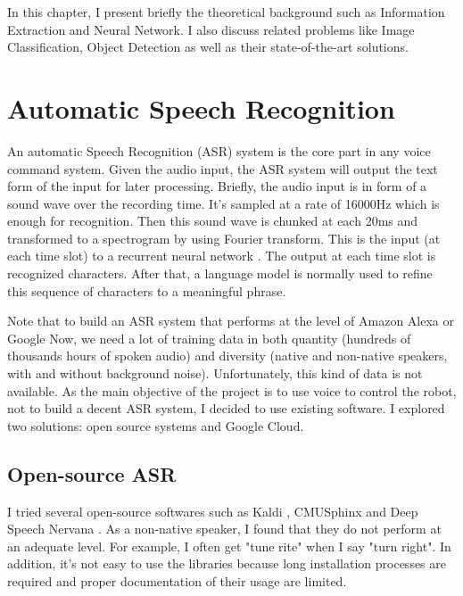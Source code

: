 In this chapter, I present briefly the theoretical background such as Information Extraction and Neural Network. I also discuss related problems like Image Classification, Object Detection as well as their state-of-the-art solutions.

\section{Automatic Speech Recognition}
\label{sec:ASR}
An automatic Speech Recognition (ASR) system is the core part in any voice command system. Given the audio input, the ASR system will output the text form of the input for later processing. Briefly, the audio input is in form of a sound wave over the recording time. It's sampled at a rate of 16000Hz which is enough for recognition. Then this sound wave is chunked at each 20ms and transformed to a spectrogram by using Fourier transform. This is the input (at each time slot) to a recurrent neural network \cite{Medium:2016}. The output at each time slot is recognized characters. After that, a language model is normally used to refine this sequence of characters to a meaningful phrase. 

Note that to build an ASR system that performs at the level of Amazon Alexa or Google Now, we need a lot of training data in both quantity (hundreds of thousands hours of spoken audio) and diversity (native and non-native speakers, with and without background noise). Unfortunately, this kind of data is not available. As the main objective of the project is to use voice to control the robot, not to build a decent ASR system, I decided to use existing software. I explored two solutions: open source systems and Google Cloud.

\subsection{Open-source ASR}
I tried several open-source softwares such as Kaldi \cite{Kaldi:2017}, CMUSphinx \cite{CMUSphinx:2017} and Deep Speech Nervana \cite{DeepSpeech:2017}. As a non-native speaker, I found that they do not perform at an adequate level. For example, I often get "tune rite" when I say "turn right". In addition, it's not easy to use the libraries because long installation processes are required and proper documentation of their usage are limited.

